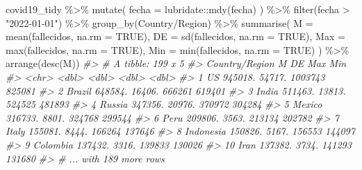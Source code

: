 \documentclass[
]{book}
\newenvironment{Shaded}{\begin{snugshade}}{\end{snugshade}}
\newcommand{\AttributeTok}[1]{\textcolor[rgb]{0.77,0.63,0.00}{#1}}
\newcommand{\CommentTok}[1]{\textcolor[rgb]{0.56,0.35,0.01}{\textit{#1}}}
\newcommand{\ConstantTok}[1]{\textcolor[rgb]{0.00,0.00,0.00}{#1}}
\newcommand{\FunctionTok}[1]{\textcolor[rgb]{0.00,0.00,0.00}{#1}}
\newcommand{\NormalTok}[1]{#1}
\newcommand{\SpecialCharTok}[1]{\textcolor[rgb]{0.00,0.00,0.00}{#1}}
\newcommand{\StringTok}[1]{\textcolor[rgb]{0.31,0.60,0.02}{#1}}
\begin{document}
\begin{Shaded}
\begin{Highlighting}[]
\NormalTok{covid19\_tidy }\SpecialCharTok{\%\textgreater{}\%}
  \FunctionTok{mutate}\NormalTok{(}
    \AttributeTok{fecha =}\NormalTok{ lubridate}\SpecialCharTok{::}\FunctionTok{mdy}\NormalTok{(fecha)}
\NormalTok{  ) }\SpecialCharTok{\%\textgreater{}\%}
  \FunctionTok{filter}\NormalTok{(fecha }\SpecialCharTok{\textgreater{}} \StringTok{"2022{-}01{-}01"}\NormalTok{) }\SpecialCharTok{\%\textgreater{}\%}
  \FunctionTok{group\_by}\NormalTok{(}\StringTok{\textasciigrave{}}\AttributeTok{Country/Region}\StringTok{\textasciigrave{}}\NormalTok{) }\SpecialCharTok{\%\textgreater{}\%}
  \FunctionTok{summarise}\NormalTok{(}
    \AttributeTok{M =} \FunctionTok{mean}\NormalTok{(fallecidos, }\AttributeTok{na.rm =} \ConstantTok{TRUE}\NormalTok{),}
    \AttributeTok{DE =} \FunctionTok{sd}\NormalTok{(fallecidos, }\AttributeTok{na.rm =} \ConstantTok{TRUE}\NormalTok{),}
    \AttributeTok{Max =} \FunctionTok{max}\NormalTok{(fallecidos, }\AttributeTok{na.rm =} \ConstantTok{TRUE}\NormalTok{),}
    \AttributeTok{Min =} \FunctionTok{min}\NormalTok{(fallecidos, }\AttributeTok{na.rm =} \ConstantTok{TRUE}\NormalTok{)}
\NormalTok{  ) }\SpecialCharTok{\%\textgreater{}\%} 
  \FunctionTok{arrange}\NormalTok{(}\FunctionTok{desc}\NormalTok{(M))}
\CommentTok{\#\textgreater{} \# A tibble: 199 x 5}
\CommentTok{\#\textgreater{}    \textasciigrave{}Country/Region\textasciigrave{}       M     DE     Max    Min}
\CommentTok{\#\textgreater{}    \textless{}chr\textgreater{}              \textless{}dbl\textgreater{}  \textless{}dbl\textgreater{}   \textless{}dbl\textgreater{}  \textless{}dbl\textgreater{}}
\CommentTok{\#\textgreater{}  1 US               945018. 54717. 1003743 825081}
\CommentTok{\#\textgreater{}  2 Brazil           648584. 16406.  666261 619401}
\CommentTok{\#\textgreater{}  3 India            511463. 13813.  524525 481893}
\CommentTok{\#\textgreater{}  4 Russia           347356. 20976.  370972 304284}
\CommentTok{\#\textgreater{}  5 Mexico           316733.  8801.  324768 299544}
\CommentTok{\#\textgreater{}  6 Peru             209806.  3563.  213134 202782}
\CommentTok{\#\textgreater{}  7 Italy            155081.  8444.  166264 137646}
\CommentTok{\#\textgreater{}  8 Indonesia        150826.  5167.  156553 144097}
\CommentTok{\#\textgreater{}  9 Colombia         137432.  3316.  139833 130026}
\CommentTok{\#\textgreater{} 10 Iran             137382.  3734.  141293 131680}
\CommentTok{\#\textgreater{} \# ... with 189 more rows}
\end{Highlighting}
\end{Shaded}
\end{document}
